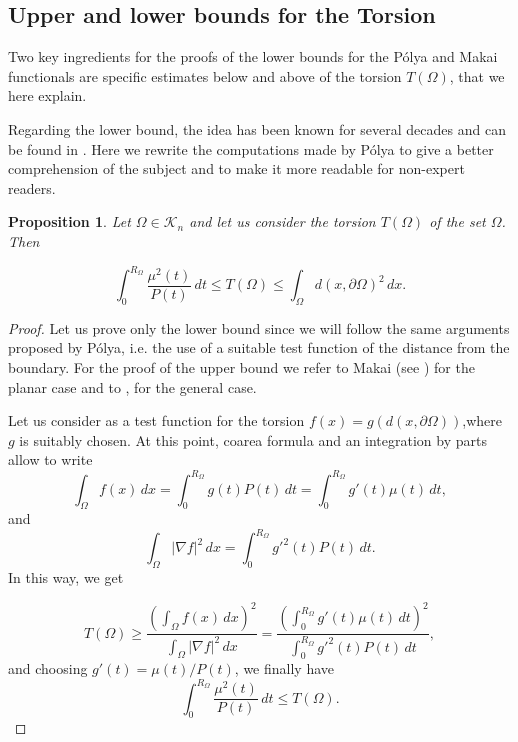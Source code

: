 \documentclass[oneside,a4paper,11pt,notitlepage]{article}
\newcommand{\abs}[1]{{\left|#1\right|}}
\theoremstyle{definition}
\theoremstyle{plain}
\newtheorem{prop}[teorema]{Proposition}
\theoremstyle{definition}
\begin{document}
\subsection{Upper and lower bounds for the Torsion}\label{subsec:webtors}

Two key ingredients for the proofs of the lower bounds for the P\'olya and Makai functionals are specific estimates below and above of the torsion $T(\Omega)$, that we here explain. 

Regarding the lower bound,
the idea has been known for several decades and can be found in \cite{polya1960}. Here we rewrite the computations made by P\'olya to give a better comprehension of the subject and to make it more readable for non-expert readers. %

\begin{prop}\label{prop:estimatestorsion}
    Let $\Omega\in \mathcal{K}_n$ and let us consider the torsion $T(\Omega)$ of the set $\Omega$. Then
    
\begin{equation*}
\label{eq:lowboundpolya}
\int_0^{R_\Omega}\frac{\mu^2(t)}{P(t)}\,dt\leq T(\Omega) \leq \int_{\Omega}d(x,\partial\Omega)^2\,dx.
\end{equation*}
\end{prop}

\begin{proof}
    Let us prove only the lower bound since we will follow the same arguments proposed by P\'olya, i.e. the use of a suitable test function of the distance from the boundary.
    For the proof of the upper bound we refer to Makai (see \cite{makai}) for the planar case and to \cite[Theorem 1.1]{prinari2023sharp}, for the general case.
    
    Let us consider as a test function for the torsion $f(x)= g(d(x,\partial\Omega))$,where $g$ is suitably chosen. At this point, coarea formula and an integration by parts allow to write
$$
\int_\Omega f(x)\, dx = \int_0^{R_\Omega} g(t) P(t) \, dt=\int_0^{R_\Omega} g'(t) \mu(t) \, dt,$$
and
\begin{equation*}
    \int_\Omega \abs{ \nabla f}^2\,dx = \int_0^{R_\Omega} g'^2(t) P(t) \, dt.
\end{equation*}
In this way, we get

\begin{equation*}
    \label{torsionpolya}
    T(\Omega) \geq \frac{\displaystyle{\left(\int_\Omega f(x)\, dx\right)^2}}{\displaystyle{\int_\Omega \abs{ \nabla f}^2\, dx}} =\frac{\displaystyle{\left(\int_0^{R_\Omega} g'(t) \mu(t) \, dt\right)^2}}{\displaystyle{\int_0^{R_\Omega} g'^2(t) P(t) \, dt}},
\end{equation*}
and choosing $g'(t) = \mu(t)/P(t)$, we finally have 
\begin{equation*}
\int_0^{R_\Omega}\frac{\mu^2(t)}{P(t)}\,dt \leq T(\Omega) .
\end{equation*}
\end{proof}
\end{document}

